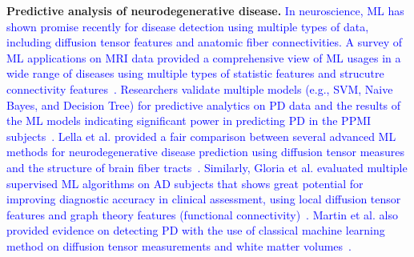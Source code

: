 \vspace{1pt}
\noindent\textbf{Predictive analysis of neurodegenerative disease.}
\textcolor{blue}{In neuroscience, ML has shown promise recently for disease detection using multiple types of data, including diffusion tensor features and anatomic fiber connectivities. A survey of ML applications on MRI data provided a comprehensive view of ML usages in a wide range of diseases using multiple types of statistic features and strucutre connectivity features~\cite{mateos2018structural}. Researchers validate multiple models (e.g., SVM, Naive Bayes, and Decision Tree) for predictive analytics on PD data and the results of the ML models indicating significant power in predicting PD in the PPMI subjects~\cite{dinov2016predictive}. Lella et al. provided a fair comparison between several advanced ML methods for neurodegenerative disease prediction using diffusion tensor measures and the structure of brain fiber tracts~\cite{10.1117/12.2274140}. Similarly, Gloria et al. evaluated multiple supervised ML algorithms on AD subjects that shows great potential for improving diagnostic accuracy in clinical assessment, using local diffusion tensor features and graph theory features (functional connectivity)~\cite{castellazzi2020machine}. Martin et al. also provided evidence on detecting PD with the use of classical machine learning method on diffusion tensor measurements and white matter volumes~\cite{doi:10.1111/jon.12214}.  
}



